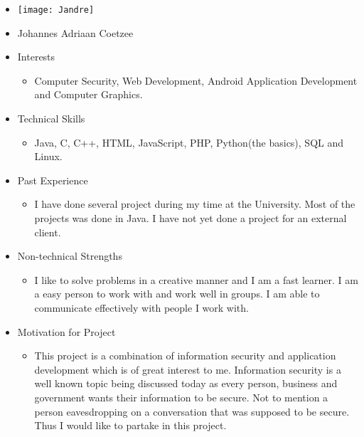 
\begin{itemize}
	\item[] \texttt{[image: Jandre]}
	\item[] Johannes Adriaan Coetzee
	\item Interests
	\begin{itemize}
		\item[] Computer Security, Web Development, Android Application Development and Computer Graphics.
	\end{itemize}
	\item Technical Skills
	\begin{itemize}
		\item[] Java, C, C++, HTML, JavaScript, PHP, Python(the basics), SQL and Linux.
	\end{itemize}
	\item Past Experience
	\begin{itemize}
		\item[] I have done several project during my time at the University. Most of the projects was done in Java. I have not yet done a project for an external client.
	\end{itemize}
	\item Non-technical Strengths
	\begin{itemize}
		\item[] I like to solve problems in a creative manner and I am a fast learner. I am a easy person to work with and work well in groups. I am able to communicate effectively with people I work with.
	\end{itemize}
	\item Motivation for Project
	\begin{itemize}
		\item[] This project is a combination of information security and application development which is of great interest to me. Information security is a well known topic being discussed today as every person, business and government wants their information to be secure. Not to mention a person eavesdropping on a conversation that was supposed to be secure. Thus I would like to partake in this project. 
	\end{itemize}
\end{itemize}